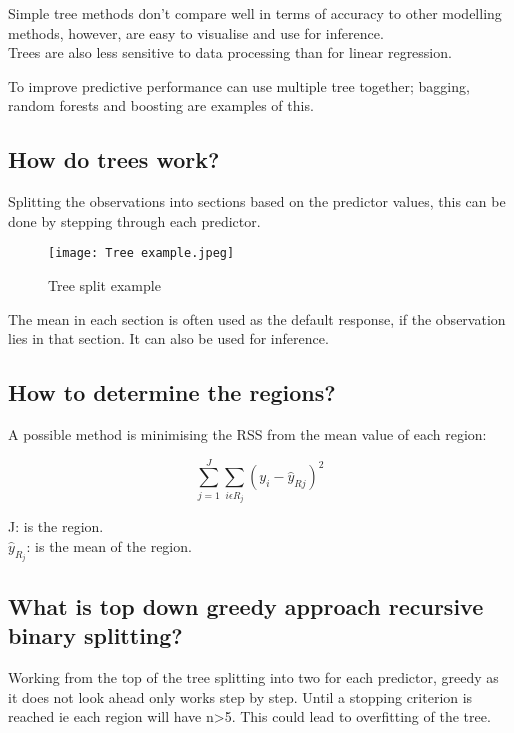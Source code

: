 \documentclass[11pt]{scrartcl} %
\begin{document}
Simple tree methods don't compare well in terms of accuracy to other modelling methods, however, are easy
to visualise and use for inference.\\

Trees are also less sensitive to data processing than for linear regression.

To improve predictive performance can use multiple tree together; bagging, random forests and boosting
are examples of this.

\subsection{How do trees work?}

Splitting the observations into sections based on the predictor values, this can be done by stepping
through each predictor.

\begin{figure}[h] %
	\centering
	\texttt{[image: Tree example.jpeg]} %
	\caption{Tree split example}
\end{figure}

The mean in each section is often used as the default response, if the observation lies in that section.
It can also be used for inference.

\subsection{How to determine the regions?}

A possible method is minimising the RSS from the mean value of each region:

\begin{equation}
	\sum^J_{j=1}\sum_{i\epsilon R_j}{(y_i-\hat{y}_{Rj})}^2
\end{equation}

J: is the region.\\
\(\hat{y}_{R_j}\): is the mean of the region.

\subsection{What is top down greedy approach recursive binary splitting?}

Working from the top of the tree splitting into two for each predictor, greedy as it does not
look ahead only works step by step. Until a stopping criterion is reached ie each region will have
n>5. This could lead to overfitting of the tree.
\end{document}
